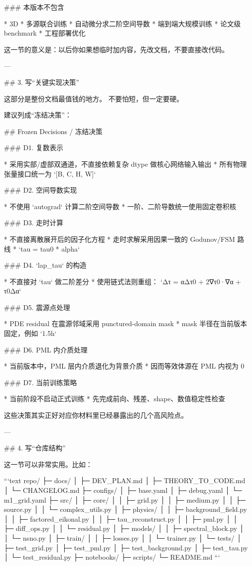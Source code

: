 ### 本版本不包含

* 3D
* 多源联合训练
* 自动微分求二阶空间导数
* 端到端大规模训练
* 论文级 benchmark
* 工程部署优化

这一节的意义是：以后你如果想临时加内容，先改文档，不要直接改代码。

---

## 3. 写“关键实现决策”

这部分是整份文档最值钱的地方。
不要怕短，但一定要硬。

建议列成“冻结决策”：

## Frozen Decisions / 冻结决策

### D1. 复数表示

* 采用实部/虚部双通道，不直接依赖复杂 dtype 做核心网络输入输出
* 所有物理张量接口统一为 `[B, C, H, W]`

### D2. 空间导数实现

* 不使用 `autograd` 计算二阶空间导数
* 一阶、二阶导数统一使用固定卷积核

### D3. 走时计算

* 不直接离散展开后的因子化方程
* 走时求解采用因果一致的 Godunov/FSM 路线
* `tau = tau0 * alpha`

### D4. `lap_tau` 的构造

* 不直接对 `tau` 做二阶差分
* 使用链式法则重组：
  `Δτ = αΔτ0 + 2∇τ0·∇α + τ0Δα`

### D5. 震源点处理

* PDE residual 在震源邻域采用 punctured-domain mask
* mask 半径在当前版本固定，例如 `1.5h`

### D6. PML 内介质处理

* 当前版本中，PML 层内介质退化为背景介质
* 因而等效体源在 PML 内视为 0

### D7. 当前训练策略

* 当前阶段不启动正式训练
* 先完成前向、残差、shape、数值稳定性检查

这些决策其实正好对应你材料里已经暴露出的几个高风险点。 

---

## 4. 写“仓库结构”

这一节可以非常实用。比如：

```text
repo/
├─ docs/
│  ├─ DEV_PLAN.md
│  ├─ THEORY_TO_CODE.md
│  └─ CHANGELOG.md
├─ configs/
│  ├─ base.yaml
│  ├─ debug.yaml
│  └─ m1_grid.yaml
├─ src/
│  ├─ core/
│  │  ├─ grid.py
│  │  ├─ medium.py
│  │  ├─ source.py
│  │  └─ complex_utils.py
│  ├─ physics/
│  │  ├─ background_field.py
│  │  ├─ factored_eikonal.py
│  │  ├─ tau_reconstruct.py
│  │  ├─ pml.py
│  │  ├─ diff_ops.py
│  │  └─ residual.py
│  ├─ models/
│  │  ├─ spectral_block.py
│  │  └─ nsno.py
│  ├─ train/
│  │  ├─ losses.py
│  │  └─ trainer.py
│  └─ tests/
│     ├─ test_grid.py
│     ├─ test_pml.py
│     ├─ test_background.py
│     ├─ test_tau.py
│     └─ test_residual.py
├─ notebooks/
├─ scripts/
└─ README.md
```

